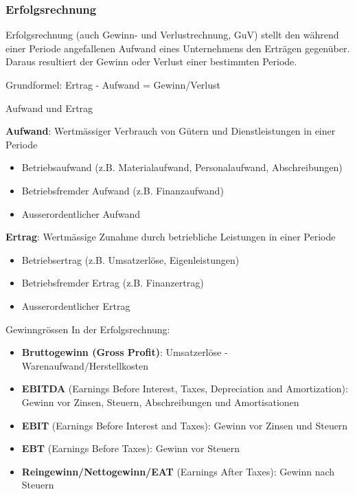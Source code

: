 \subsubsection{Erfolgsrechnung}

\begin{definition}{Erfolgsrechnung}
 (auch Gewinn- und Verlustrechnung, GuV) stellt den während einer Periode angefallenen Aufwand eines Unternehmens den Erträgen gegenüber. Daraus resultiert der Gewinn oder Verlust einer bestimmten Periode.

Grundformel: Ertrag - Aufwand = Gewinn/Verlust
\end{definition}

\begin{definition}{Aufwand und Ertrag}

    \textbf{Aufwand}: Wertmässiger Verbrauch von Gütern und Dienstleistungen in einer Periode
    \begin{itemize}
        \item Betriebsaufwand (z.B. Materialaufwand, Personalaufwand, Abschreibungen)
        \item Betriebsfremder Aufwand (z.B. Finanzaufwand)
        \item Ausserordentlicher Aufwand
    \end{itemize}
\textbf{Ertrag}: Wertmässige Zunahme durch betriebliche Leistungen in einer Periode
    \begin{itemize}
        \item Betriebsertrag (z.B. Umsatzerlöse, Eigenleistungen)
        \item Betriebsfremder Ertrag (z.B. Finanzertrag)
        \item Ausserordentlicher Ertrag
    \end{itemize}
\end{definition}

\begin{definition}{Gewinngrössen}
In der Erfolgsrechnung:
\begin{itemize}
    \item \textbf{Bruttogewinn (Gross Profit)}: Umsatzerlöse - Warenaufwand/Herstellkosten
    \item \textbf{EBITDA} (Earnings Before Interest, Taxes, Depreciation and Amortization): Gewinn vor Zinsen, Steuern, Abschreibungen und Amortisationen
    \item \textbf{EBIT} (Earnings Before Interest and Taxes): Gewinn vor Zinsen und Steuern
    \item \textbf{EBT} (Earnings Before Taxes): Gewinn vor Steuern
    \item \textbf{Reingewinn/Nettogewinn/EAT} (Earnings After Taxes): Gewinn nach Steuern
\end{itemize}
\end{definition}

